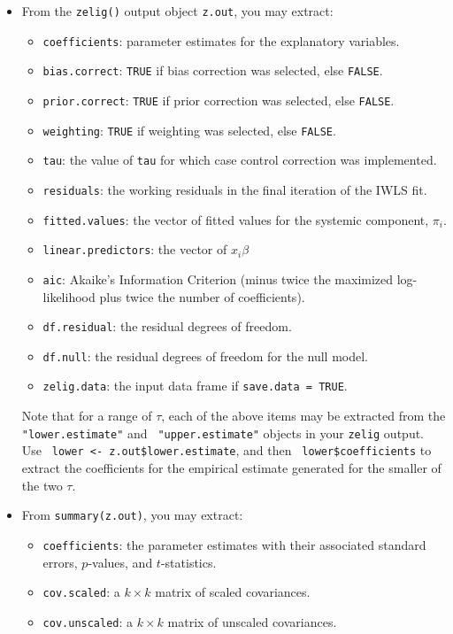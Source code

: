 \begin{itemize}
\item From the {\tt zelig()} output object {\tt z.out}, you may
  extract:
   \begin{itemize}
   \item {\tt coefficients}: parameter estimates for the explanatory
     variables.
   \item {\tt bias.correct}: {\tt TRUE} if bias correction was
selected, else {\tt FALSE}.  
    \item {\tt prior.correct}: {\tt TRUE} if prior correction was
selected, else {\tt FALSE}. 
    \item {\tt weighting}: {\tt TRUE} if weighting was selected, else
{\tt FALSE}.  
    \item {\tt tau}:  the value of {\tt tau} for which case control
correction was implemented.  
   \item {\tt residuals}: the working residuals in the final iteration
     of the IWLS fit.
   \item {\tt fitted.values}: the vector of fitted values for the
     systemic component, $\pi_i$.
   \item {\tt linear.predictors}: the vector of $x_{i} \beta$
   \item {\tt aic}: Akaike's Information Criterion (minus twice the
     maximized log-likelihood plus twice the number of coefficients).
   \item {\tt df.residual}: the residual degrees of freedom.
   \item {\tt df.null}: the residual degrees of freedom for the null
     model.
   \item {\tt zelig.data}: the input data frame if {\tt save.data = TRUE}.  
   \end{itemize}
   Note that for a range of $\tau$, each of the above items may be
   extracted from the {\tt "lower.estimate"} and {\tt
     "upper.estimate"} objects in your {\tt zelig} output.  Use {\tt
     lower <- z.out\$lower.estimate}, and then {\tt
     lower\$coefficients} to extract the coefficients for the
   empirical estimate generated for the smaller of the two $\tau$.

\item From {\tt summary(z.out)}, you may extract: 
   \begin{itemize}
   \item {\tt coefficients}: the parameter estimates with their
     associated standard errors, $p$-values, and $t$-statistics.
   \item{\tt cov.scaled}: a $k \times k$ matrix of scaled covariances.
   \item{\tt cov.unscaled}: a $k \times k$ matrix of unscaled
     covariances.  
   \end{itemize}


\end{itemize}
